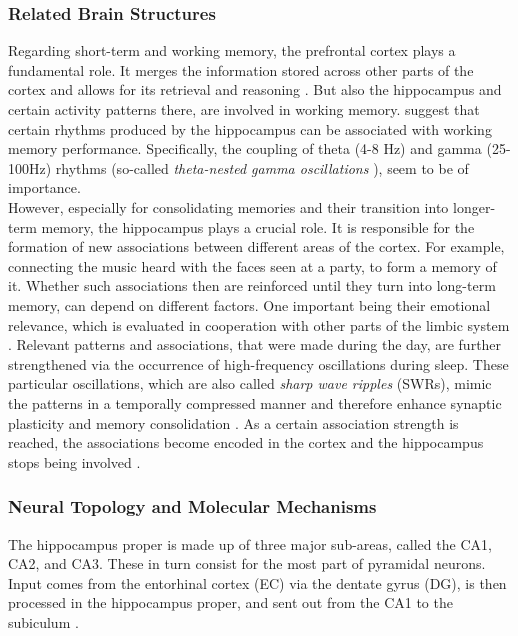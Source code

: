     \subsubsection{Related Brain Structures}
    Regarding short-term and working memory, the prefrontal cortex plays a fundamental role. It merges the information stored across other parts of the cortex and allows for its retrieval and reasoning \cite{thebrain-memory-neurological-a}. But also the hippocampus and certain activity patterns there, are involved in working memory. \textcite{Axmacher.2010} suggest that certain rhythms produced by the hippocampus can be associated with working memory performance. Specifically, the coupling of theta (4-8 Hz) and gamma (25-100Hz) rhythms (so-called \textit{theta-nested gamma oscillations} \cite{Aussel.2018}), seem to be of importance.\\
    However, especially for consolidating memories and their transition into longer-term memory, the hippocampus plays a crucial role. It is responsible for the formation of new associations between different areas of the cortex. For example, connecting the music heard with the faces seen at a party, to form a memory of it. Whether such associations then are reinforced until they turn into long-term memory, can depend on different factors. One important being their emotional relevance, which is evaluated in cooperation with other parts of the limbic system \cite{thebrain-memory-neurological-a}. Relevant patterns and associations, that were made during the day, are further strengthened via the occurrence of high-frequency oscillations during sleep. These particular oscillations, which are also called \textit{sharp wave ripples} (SWRs), mimic the patterns in a temporally compressed manner and therefore enhance synaptic plasticity and memory consolidation \cite{Girardeau.2011}. As a certain association strength is reached, the associations become encoded in the cortex and the hippocampus stops being involved \cite{thebrain-memory-neurological-a}.
    
    \subsubsection{Neural Topology and Molecular Mechanisms}
    The hippocampus proper is made up of three major sub-areas, called the CA1, CA2, and CA3. These in turn consist for the most part of pyramidal neurons. Input comes from the entorhinal cortex (EC) via the dentate gyrus (DG), is then processed in the hippocampus proper, and sent out from the CA1 to the subiculum \cite{thebrain-memory-Cellular-a}.
    
